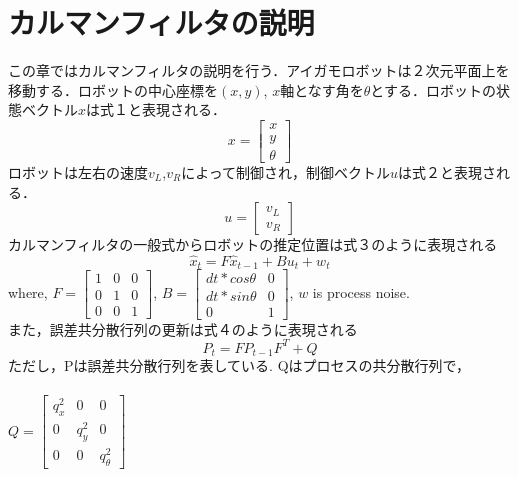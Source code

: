\documentclass[a4paper]{article}
\begin{document}
\section{カルマンフィルタの説明}
この章ではカルマンフィルタの説明を行う．アイガモロボットは２次元平面上を移動する．ロボットの中心座標を$(x,y)$, $x$軸となす角を$\theta$とする．ロボットの状態ベクトル$x$は式１と表現される．
\begin{equation}
    x = \begin{bmatrix}
        x \\
        y \\
        \theta
        \end{bmatrix} 
\end{equation}
ロボットは左右の速度$v_{L}$,$v_{R}$によって制御され，制御ベクトル$u$は式２と表現される．
\begin{equation}
    u = \begin{bmatrix}
        v_{L} \\
        v_{R} 
        \end{bmatrix} 
\end{equation}
%
%
カルマンフィルタの一般式からロボットの推定位置は式３のように表現される
\begin{equation}
    \hat{x}_{t} =F\hat{x}_{t-1} + Bu_{t} + w_{t}
\end{equation}
where, $F = \begin{bmatrix} 1 & 0 & 0 \\  0 & 1 & 0 \\  0 & 0 & 1 \end{bmatrix}$,
$B = \begin{bmatrix} dt * cos\theta & 0 \\  dt * sin\theta & 0 \\ 0 & 1 \end{bmatrix}$, 
$w$ is process noise.\\
%
%
また，誤差共分散行列の更新は式４のように表現される
\begin{equation}
    P_{t} = F P_{t-1} F^{T} + Q
    \label{eq:4}
\end{equation}
ただし，Pは誤差共分散行列を表している. Qはプロセスの共分散行列で，\\ \\$Q = \begin{bmatrix} q_{x}^{2} & 0 & 0 \\  0 & q_{y}^{2} & 0 \\  0 & 0 & q_{\theta}^{2} \end{bmatrix}$\\ \\
\end{document}
